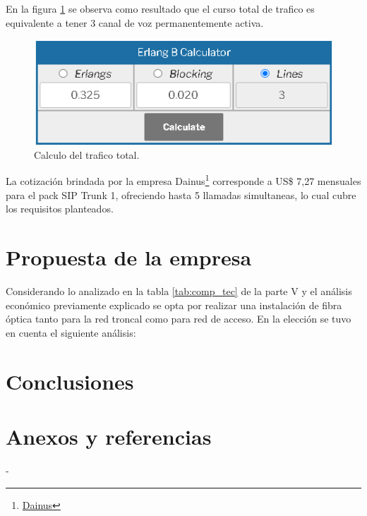 \documentclass[11pt,a4paper]{article}
\begin{document}
En la figura \ref{fig:erla} se observa como resultado que el curso total de trafico es equivalente a tener 3 canal de voz permanentemente activa. 

\begin{figure}[htbp]
  \centering
  \includegraphics[width=0.6\linewidth]{fotos_ema/erlang.png}
  \caption{Calculo del trafico total.}
  \label{fig:erla}
\end{figure}

La cotización brindada por la empresa Dainus\footnote{\href{https://dainus.net/sip}{Dainus}} corresponde a US\$ 7,27 mensuales para el pack SIP Trunk 1, ofreciendo hasta 5 llamadas simultaneas, lo cual cubre los requisitos planteados.   



\part{Propuesta de la empresa}

Considerando lo analizado en la tabla \ref{tab:comp_tec} de la parte V y el análisis económico previamente explicado se opta por realizar una instalación de fibra óptica tanto para la red troncal como para red de acceso.
En la elección se tuvo en cuenta el siguiente análisis: 





\part{Conclusiones}

\part{Anexos y referencias}

-
\end{document}
